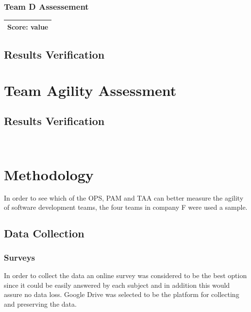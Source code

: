 \subsubsection{Team D Assessement}
\begin{tabular}{| p{3cm} | }
\hline
\textbf{Score:} value \\ \hline
\end{tabular}

\subsection{Results Verification}



\section{Team Agility Assessment}
\subsection{Results Verification}
~




\section{Methodology}
In order to see which of the OPS, PAM and TAA can better measure the agility of software development teams, the four teams in company F were used a sample.

\subsection{Data Collection}


\subsubsection{Surveys}
In order to collect the data an online survey was considered to be the best option since it could be easily answered by each subject and in addition this would assure no data loss. Google Drive \texttrademark \cite{google_drive} was selected to be the platform for collecting and preserving the data.

